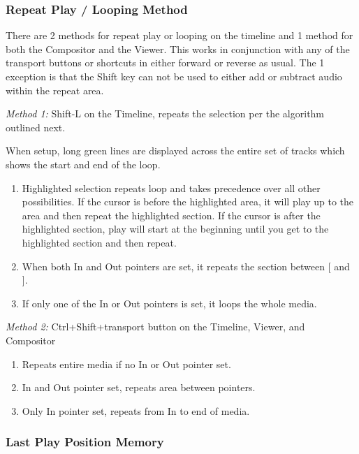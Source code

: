 \subsubsection*{Repeat Play / Looping Method}%
\label{ssub:repeat_play_looping_method}

There are 2 methods for repeat play or looping on the timeline and 1 method for both the Compositor and the Viewer.  This works in conjunction with any of the transport buttons or shortcuts in either forward or reverse as usual.  The 1 exception is that the Shift key can not be used to either add or subtract audio within the repeat area.

\textit{Method 1:} Shift-L on the Timeline, repeats the selection per the algorithm outlined next.
  
When setup, long green lines are displayed across the entire set of tracks which shows the start and end of the loop.
\begin{enumerate}
    \item  Highlighted selection repeats loop and takes precedence over all other possibilities.  
        If the cursor is before the highlighted area, it will play up to the area and then repeat the highlighted section.  
        If the cursor is after the highlighted section, play will start at the beginning until you get to the
        highlighted section and then repeat.
    \item  When both In and Out pointers are set, it repeats the section between [ and ].
    \item  If only one of the In or Out pointers is set, it loops the whole media.
\end{enumerate}

\textit{Method 2:} Ctrl+Shift+transport button on the Timeline, Viewer, and Compositor

\begin{enumerate}
    \item Repeats entire media if no In or Out pointer set.
    \item  In and Out pointer set, repeats area between pointers.
    \item  Only In pointer set, repeats from In to end of media.
\end{enumerate}

\subsubsection*{Last Play Position Memory}%
\label{ssub:last_play_position_memory}


